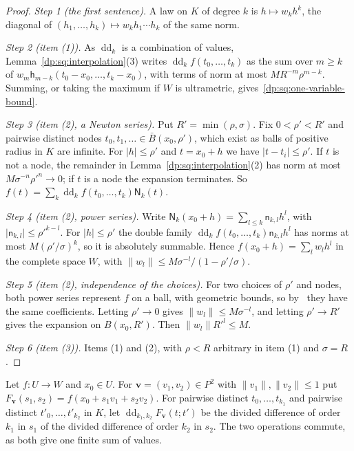 \documentclass[11pt]{amsart}
\theoremstyle{definition}
\theoremstyle{remark}
\numberwithin{equation}{section}
\newcommand{\abs}[1]{\lvert #1\rvert}
\newcommand{\norm}[1]{\lVert #1\rVert}
\theoremstyle{plain}
\theoremstyle{definition}
\theoremstyle{plain}
\begin{document}
\begin{proof}
\emph{Step 1 (the first sentence).} A law on $K$ of degree $k$ is $h\mapsto w_kh^k$, the diagonal of $(h_1,\dots,h_k)\mapsto w_kh_1\cdots h_k$ of the same norm.

\emph{Step 2 (item (1)).} As $\operatorname{dd}_k$ is a combination of values, Lemma~\ref{dp:sq:interpolation}(3) writes $\operatorname{dd}_kf(t_0,\dots,t_k)$ as the sum over $m\ge k$ of $w_m\mathsf h_{m-k}(t_0-x_0,\dots,t_k-x_0)$, with terms of norm at most $MR^{-m}\rho^{m-k}$. Summing, or taking the maximum if $W$ is ultrametric, gives~\eqref{dp:sq:one-variable-bound}.

\emph{Step 3 (item (2), a Newton series).} Put $R'=\min(\rho,\sigma)$. Fix $0<\rho'<R'$ and pairwise distinct nodes $t_0,t_1,\dots\in\bar B(x_0,\rho')$, which exist as balls of positive radius in $K$ are infinite. For $\abs h\le\rho'$ and $t=x_0+h$ we have $\abs{t-t_i}\le\rho'$. If $t$ is not a node, the remainder in Lemma~\ref{dp:sq:interpolation}(2) has norm at most $M\sigma^{-n}\rho'^n\to0$; if $t$ is a node the expansion terminates. So $f(t)=\sum_k\operatorname{dd}_kf(t_0,\dots,t_k)\mathsf N_k(t)$.

\emph{Step 4 (item (2), power series).} Write $\mathsf N_k(x_0+h)=\sum_{l\le k}\mathsf n_{k,l}h^l$, with $\abs{\mathsf n_{k,l}}\le\rho'^{k-l}$. For $\abs h\le\rho'$ the double family $\operatorname{dd}_kf(t_0,\dots,t_k)\mathsf n_{k,l}h^l$ has norms at most $M(\rho'/\sigma)^k$, so it is absolutely summable. Hence $f(x_0+h)=\sum_lw_lh^l$ in the complete space $W$, with $\norm{w_l}\le M\sigma^{-l}/(1-\rho'/\sigma)$.

\emph{Step 5 (item (2), independence of the choices).} For two choices of $\rho'$ and nodes, both power series represent $f$ on a ball, with geometric bounds, so by~\cite[Lemma~A.1]{I} they have the same coefficients. Letting $\rho'\to0$ gives $\norm{w_l}\le M\sigma^{-l}$, and letting $\rho'\to R'$ gives the expansion on $B(x_0,R')$. Then $\norm{w_l}R'^l\le M$.

\emph{Step 6 (item (3)).} Items (1) and (2), with $\rho<R$ arbitrary in item (1) and $\sigma=R$.
\end{proof}

Let $f\colon U\to W$ and $x_0\in U$. For $\mathbf v=(v_1,v_2)\in P^2$ with $\norm{v_1},\norm{v_2}\le1$ put $F_{\mathbf v}(s_1,s_2)=f(x_0+s_1v_1+s_2v_2)$. For pairwise distinct $t_0,\dots,t_{k_1}$ and pairwise distinct $t'_0,\dots,t'_{k_2}$ in $K$, let $\operatorname{dd}_{k_1,k_2}F_{\mathbf v}(t;t')$ be the divided difference of order $k_1$ in $s_1$ of the divided difference of order $k_2$ in $s_2$. The two operations commute, as both give one finite sum of values.
\end{document}
